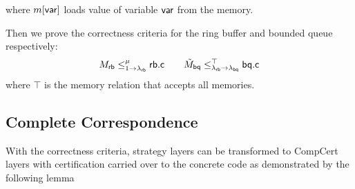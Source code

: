\documentclass[acmsmall,review,anonymous]{acmart}\settopmatter{printfolios=true,printccs=false,printacmref=false}
\begin{document}
\begin{example}
  where $m[ \mathsf{var} ]$ loads value of variable $ \mathsf{var} $
  from the memory.
  
  Then we prove the correctness criteria for the ring buffer
  and bounded queue respectively:
  \[
    M_{ \mathsf{rb} } \le^\mu_{1 \rightarrow \lambda_{ \mathsf{rb} }}  \mathsf{rb.c} 
    \qquad
    \tilde{M}_{ \mathsf{bq} } \le^\top_{\lambda_{ \mathsf{rb} } \rightarrow \lambda_{ \mathsf{bq} }}  \mathsf{bq.c} 
  \]
  where $\top$ is the memory relation that accepts all memories.
\end{example}

\subsection{Complete Correspondence}
\label{sec:stcal:correspondence}

With the correctness criteria, strategy layers
can be transformed to CompCert layers with
certification carried over
to the concrete code as demonstrated
by the following lemma
\end{document}
